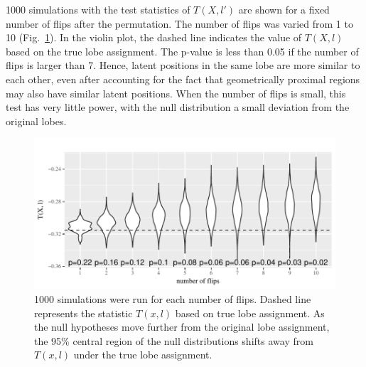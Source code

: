 \documentclass[journal,twoside,web]{ieeecolor}
\begin{document}
1000 simulations with the test statistics  of $T(X, l')$ are shown for a fixed number of flips after the permutation. 
The number of flips was varied from 1 to 10  (Fig.~\ref{fig:violin_plot}). In the violin plot, the dashed line indicates the value of $T(X, l)$ based on the true lobe assignment. 
The p-value is less than 0.05 if the number of flips is larger than 7.
Hence, latent positions in the same lobe are more similar to each other, even after accounting for the fact that geometrically proximal regions may also have similar latent positions.
When the number of flips is small, this test has very little power, with the null distribution a small deviation from the original lobes.

\begin{figure}[!htbp]
\centering
\includegraphics[width=1\linewidth]{violinplot_new_flip_2norm_1_8.pdf}
\caption{
1000 simulations were run for each number of flips. Dashed line represents the statistic $T(x,l)$ based on true lobe assignment. As the null hypotheses move further from the original lobe assignment, the 95\% central region of the null distributions shifts away from $T(x,l)$ under the true lobe assignment.}
\label{fig:violin_plot}
\end{figure}

\end{document}
